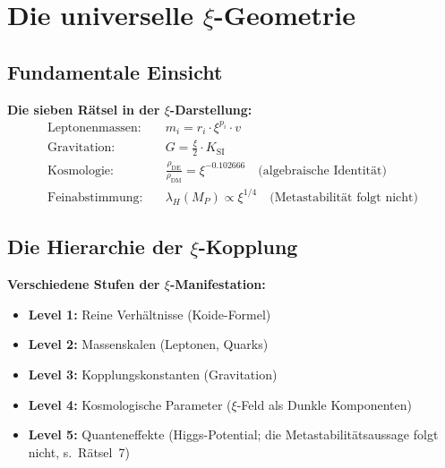 	\section{Die universelle $\xi$-Geometrie}
	\subsection{Fundamentale Einsicht}
	\textbf{Die sieben Rätsel in der $\xi$-Darstellung:}
	\begin{align}
		\text{Leptonenmassen:} &\quad m_i = r_i \cdot \xi^{p_i} \cdot v \\
		\text{Gravitation:} &\quad G = \frac{\xi}{2} \cdot K_{\text{SI}} \\
		\text{Kosmologie:} &\quad \frac{\rho_{\text{DE}}}{\rho_{\text{DM}}} = \xi^{-0.102666} \quad \text{(algebraische Identität)} \\
		\text{Feinabstimmung:} &\quad \lambda_H(M_P) \propto \xi^{1/4} \quad \text{(Metastabilität folgt nicht)}
	\end{align}
	\subsection{Die Hierarchie der $\xi$-Kopplung}
	\textbf{Verschiedene Stufen der $\xi$-Manifestation:}
	\begin{itemize}
		\item \textbf{Level 1:} Reine Verhältnisse (Koide-Formel)
		\item \textbf{Level 2:} Massenskalen (Leptonen, Quarks)
		\item \textbf{Level 3:} Kopplungskonstanten (Gravitation)
		\item \textbf{Level 4:} Kosmologische Parameter ($\xi$-Feld als Dunkle Komponenten)
		\item \textbf{Level 5:} Quanteneffekte (Higgs-Potential; die Metastabilitätsaussage folgt nicht, s.~Rätsel~7)
	\end{itemize}
